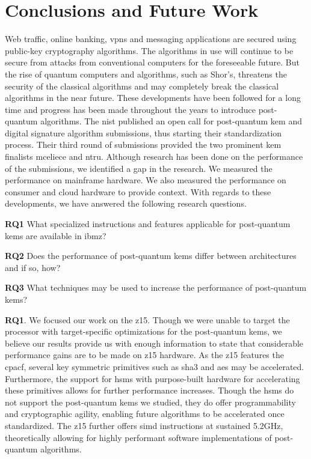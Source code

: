 \chapter{Conclusions and Future Work}
\label{chapter:conclusion}

\noindent Web traffic, online banking, \glspl{vpn} and messaging applications are secured using public-key cryptography algorithms. The algorithms in use will continue to be secure from attacks from conventional computers for the foreseeable future.  But the rise of quantum computers and algorithms, such as Shor's, threatens the security of the classical algorithms and may completely break the classical algorithms in the near future. These developments have been followed for a long time and progress has been made throughout the years to introduce \gls{post-quantum} algorithms. The \acrfull{nist} published an open call for \gls{post-quantum} \gls{kem} and digital signature algorithm submissions, thus starting their standardization process. Their third round of submissions provided the two prominent \gls{kem} finalists \gls{mceliece} and \gls{ntru}. Although research has been done on the performance of the submissions, we identified a gap in the research. We measured the performance on mainframe hardware. We also measured the performance on consumer and cloud hardware to provide context. With regards to these developments, we have answered the following research questions.

\begin{description}
    \item \textbf{RQ1} What specialized instructions and features applicable for \gls{post-quantum} \acrlong{kem}s are available in \gls{ibmz}?
    
    \item \textbf{RQ2} Does the performance of \gls{post-quantum} \acrlong{kem}s differ between architectures and if so, how?
    
    \item \textbf{RQ3} What techniques may be used to increase the performance of \gls{post-quantum} \acrlong{kem}s?
\end{description}

\noindent\textbf{RQ1}. We focused our work on the \gls{z15}. Though we were unable to target the processor with target-specific optimizations for the \gls{post-quantum} \glspl{kem}, we believe our results provide us with enough information to state that considerable performance gains are to be made on \gls{z15} hardware. As the \gls{z15} features the \gls{cpacf}, several key symmetric primitives such as \gls{sha3} and \gls{aes} may be accelerated. Furthermore, the support for \glspl{hsm} with purpose-built hardware for accelerating these primitives allows for further performance increases. Though the \glspl{hsm} do not support the \gls{post-quantum} \glspl{kem} we studied, they do offer programmability and cryptographic agility, enabling future algorithms to be accelerated once standardized. The \gls{z15} further offers \gls{simd} instructions at sustained 5.2GHz, theoretically allowing for highly performant software implementations of \gls{post-quantum} algorithms. 

